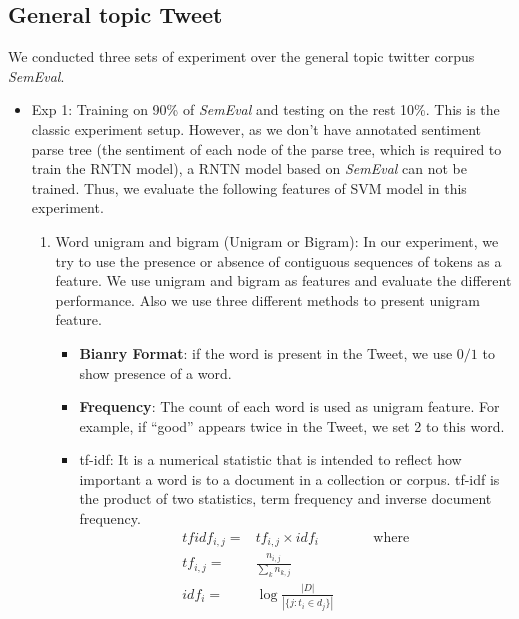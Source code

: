 \subsection{General topic Tweet}
We conducted three sets of experiment over the general topic twitter corpus \textit{SemEval}. 
\begin{itemize}
\item Exp 1: Training on 90\% of \textit{SemEval} and testing on the rest 10\%. 
This is the classic experiment setup. However, as we don't have annotated sentiment parse tree  (the sentiment of each node of the parse tree, which is required to train the RNTN model), a RNTN model based on \textit{SemEval} can not be trained. Thus, we evaluate the following features of SVM model in this experiment. 

\begin{enumerate}
\item Word unigram and bigram (Unigram or Bigram): In our experiment, we try to use the presence or absence of contiguous sequences of tokens as a feature. We use unigram and bigram as features and evaluate the different performance. Also we use three different methods to present unigram feature. 
  \begin{itemize}
      \item \textbf{Bianry Format}: if the word is present in the Tweet, we use $0/1$ to show presence of a word. 
      \item \textbf{Frequency}: The count of each word is used as unigram feature. For example, if “good” appears twice in the Tweet, we set 2 to this word.
      \item {tf-idf}: It is a numerical statistic that is intended to reflect how important a word is to a document in a collection or corpus. tf-idf is the product of two statistics, term frequency and inverse document frequency. 
      \begin{eqnarray*}
      tfidf_{i,j} = & tf_{i,j} \times idf_{i} & \qquad \text{where} \\
      tf_{i,j} = & \frac{n_{i,j}}{\sum_k n_{k,j}} & \\
      idf_i = & \log \frac{|D|}{|\{j: t_i \in d_j\}|} &
      \end{eqnarray*}   
  \end{itemize}
  

\end{enumerate}
\end{itemize}
